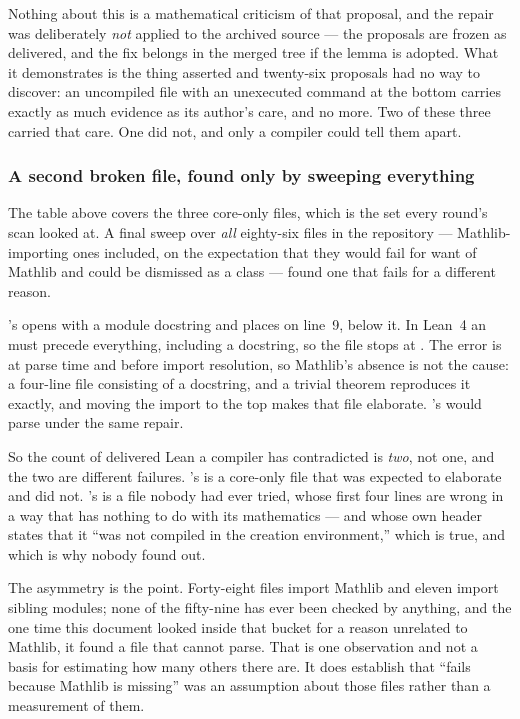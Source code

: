 Nothing about this is a mathematical criticism of that proposal, and the repair
was deliberately \emph{not} applied to the archived source --- the proposals
are frozen as delivered, and the fix belongs in the merged tree if the lemma is
adopted. What it demonstrates is the thing  asserted and twenty-six
proposals had no way to discover: an uncompiled  file with an
unexecuted  command at the bottom carries exactly as much
evidence as its author's care, and no more. Two of these three carried that
care. One did not, and only a compiler could tell them apart.

\subsubsection*{A second broken file, found only by sweeping everything}

The table above covers the three core-only files, which is the set every
round's scan looked at. A final sweep over \emph{all} eighty-six
 files in the repository --- Mathlib-importing ones included, on
the expectation that they would fail for want of Mathlib and could be dismissed
as a class --- found one that fails for a different reason.

's  opens with a module docstring and
places  on line~9, below it. In Lean~4 an 
must precede everything, including a docstring, so the file stops at
.
The error is at parse time and before import resolution, so Mathlib's absence
is not the cause: a four-line file consisting of a docstring,  and a trivial theorem reproduces it exactly, and moving the import to the
top makes that file elaborate. 's would parse under the same repair.

So the count of delivered Lean a compiler has contradicted is \emph{two}, not
one, and the two are different failures. 's is a core-only file that
was expected to elaborate and did not. 's is a file nobody had ever
tried, whose first four lines are wrong in a way that has nothing to do with
its mathematics --- and whose own header states that it ``was not compiled in
the creation environment,'' which is true, and which is why nobody found out.

The asymmetry is the point. Forty-eight files import Mathlib and eleven import
sibling modules; none of the fifty-nine has ever been checked by anything, and
the one time this document looked inside that bucket for a reason unrelated to
Mathlib, it found a file that cannot parse. That is one observation and not a
basis for estimating how many others there are. It does establish that
``fails because Mathlib is missing'' was an assumption about those files rather
than a measurement of them.

